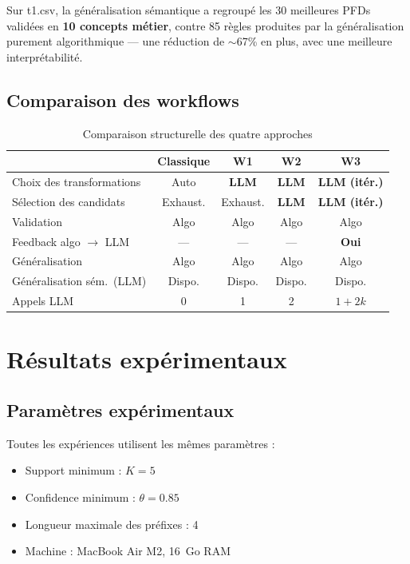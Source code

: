 \documentclass[12pt,a4paper]{article}
\begin{document}
Sur t1.csv, la g\'{e}n\'{e}ralisation s\'{e}mantique a regroup\'{e} les 30 meilleures PFDs valid\'{e}es en \textbf{10 concepts m\'{e}tier}, contre 85 r\`{e}gles produites par la g\'{e}n\'{e}ralisation purement algorithmique --- une r\'{e}duction de $\sim$67\% en plus, avec une meilleure interpr\'{e}tabilit\'{e}.

\subsection{Comparaison des workflows}

\begin{table}[H]
\centering
\caption{Comparaison structurelle des quatre approches}
\small
\begin{tabular}{@{}lcccc@{}}
\toprule
& \textbf{Classique} & \textbf{W1} & \textbf{W2} & \textbf{W3} \\
\midrule
Choix des transformations & Auto & \textbf{LLM} & \textbf{LLM} & \textbf{LLM (it\'{e}r.)} \\
S\'{e}lection des candidats & Exhaust. & Exhaust. & \textbf{LLM} & \textbf{LLM (it\'{e}r.)} \\
Validation & Algo & Algo & Algo & Algo \\
Feedback algo $\to$ LLM & --- & --- & --- & \textbf{Oui} \\
G\'{e}n\'{e}ralisation & Algo & Algo & Algo & Algo \\
G\'{e}n\'{e}ralisation s\'{e}m.\ (LLM) & Dispo. & Dispo. & Dispo. & Dispo. \\
Appels LLM & 0 & 1 & 2 & $1 + 2k$ \\
\bottomrule
\end{tabular}
\end{table}

\section{R\'{e}sultats exp\'{e}rimentaux}
\label{sec:resultats}

\subsection{Param\`{e}tres exp\'{e}rimentaux}

Toutes les exp\'{e}riences utilisent les m\^{e}mes param\`{e}tres :
\begin{itemize}
    \item Support minimum : $K = 5$
    \item Confidence minimum : $\theta = 0.85$
    \item Longueur maximale des pr\'{e}fixes : 4
    \item Machine : MacBook Air M2, 16~Go RAM
\end{itemize}
\end{document}
